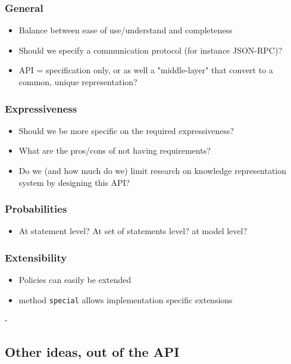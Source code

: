 \subsubsection{General}


\begin{itemize}
\item  Balance between ease of use/understand and completeness
\item  Should we specify a communication protocol (for instance JSON-RPC)?
\item  API = specification only, or as well a "middle-layer" that convert to a common, unique representation?
\end{itemize}

\subsubsection{Expressiveness}


\begin{itemize}
\item  Should we be more specific on the required expressiveness?
\item  What are the pros/cons of not having requirements?
\item  Do we (and how much do we) limit research on knowledge representation system by designing this API?
\end{itemize}

\subsubsection{Probabilities}


\begin{itemize}
\item  At statement level? At set of statements level? at model level?
\end{itemize}

\subsubsection{Extensibility}


\begin{itemize}
\item  Policies can easily be extended
\item  method \texttt{special} allows implementation specific extensions
\end{itemize}
-


\subsection{Other ideas, out of the API}


